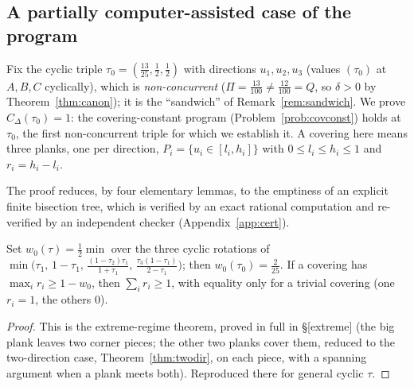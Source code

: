 
\subsection*{A partially computer-assisted case of the program}

Fix the cyclic triple $\tau_0=(\tfrac{13}{25},\tfrac12,\tfrac12)$ with
directions $u_1,u_2,u_3$ (values $(\tau_0)$ at $A,B,C$ cyclically), which is
\emph{non-concurrent} ($\Pi=\tfrac{13}{100}\ne\tfrac{12}{100}=Q$, so
$\delta>0$ by Theorem~\ref{thm:canon}); it is the ``sandwich'' of
Remark~\ref{rem:sandwich}. We prove $C_\Delta(\tau_0)=1$: the
covering-constant program (Problem~\ref{prob:covconst}) holds at $\tau_0$,
the first non-concurrent triple for which we establish it. A covering here
means three planks, one per direction, $P_i=\{u_i\in[l_i,h_i]\}$ with
$0\le l_i\le h_i\le1$ and $r_i=h_i-l_i$.

The proof reduces, by four elementary lemmas, to the emptiness of an
explicit finite bisection tree, which is verified by an exact rational
computation and re-verified by an independent checker (Appendix~\ref{app:cert}).

\begin{lemma}\label{lem:extreme}
Set $w_0(\tau)=\tfrac12\min$ over the three cyclic rotations of
$\min\bigl(\tau_1,\,1-\tau_1,\,\tfrac{(1-\tau_2)\tau_1}{1+\tau_1},\,
\tfrac{\tau_3(1-\tau_1)}{2-\tau_1}\bigr)$; then $w_0(\tau_0)=\tfrac2{25}$. If a
covering has $\max_i r_i\ge1-w_0$, then $\sum_ir_i\ge1$, with equality only
for a trivial covering (one $r_i=1$, the others $0$).
\end{lemma}
\begin{proof}
This is the extreme-regime theorem, proved in full in \S[extreme] (the big
plank leaves two corner pieces; the other two planks cover them, reduced to
the two-direction case, Theorem~\ref{thm:twodir}, on each piece, with a
spanning argument when a plank meets both). Reproduced there for general
cyclic $\tau$.
\end{proof}

